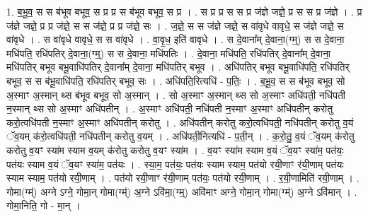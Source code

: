 \documentclass[17pt]{extarticle}
\begin{document}
1. ब॒भू॒व॒ स स ब॑भूव बभूव॒ स प्र प्र स ब॑भूव बभूव॒ स प्र । . स प्र प्र स स प्र ज॑ज्ञे जज्ञे॒ प्र स स प्र ज॑ज्ञे । . प्र ज॑ज्ञे जज्ञे॒ प्र प्र ज॑ज्ञे॒ स स ज॑ज्ञे॒ प्र प्र ज॑ज्ञे॒ सः । . ज॒ज्ञे॒ स स ज॑ज्ञे जज्ञे॒ स वा॑वृधे वावृधे॒ स ज॑ज्ञे जज्ञे॒ स वा॑वृधे । . स वा॑वृधे वावृधे॒ स स वा॑वृधे । . वा॒वृ॒ध॒ इति॑ वावृधे । . स दे॒वाना᳚म् दे॒वाना॒(ग्म्॒) स स दे॒वाना॒ मधि॑पति॒ रधि॑पतिर् दे॒वाना॒(ग्म्॒) स स दे॒वाना॒ मधि॑पतिः । . दे॒वाना॒ मधि॑पति॒ रधि॑पतिर् दे॒वाना᳚म् दे॒वाना॒ मधि॑पतिर् बभूव बभू॒वाधि॑पतिर् दे॒वाना᳚म् दे॒वाना॒ मधि॑पतिर् बभूव । . अधि॑पतिर् बभूव बभू॒वाधि॑पति॒ रधि॑पतिर् बभूव॒ स स ब॑भू॒वाधि॑पति॒ रधि॑पतिर् बभूव॒ सः । . अधि॑पति॒रित्यधि॑ - प॒तिः॒ । . ब॒भू॒व॒ स स ब॑भूव बभूव॒ सो अ॒स्माꣳ अ॒स्मान् थ्स ब॑भूव बभूव॒ सो अ॒स्मान् । . सो अ॒स्माꣳ अ॒स्मान् थ्स सो अ॒स्माꣳ अधि॑पती॒ नधि॑पती न॒स्मान् थ्स सो अ॒स्माꣳ अधि॑पतीन् । . अ॒स्माꣳ अधि॑पती॒ नधि॑पती न॒स्माꣳ अ॒स्माꣳ अधि॑पतीन् करोतु करो॒त्वधि॑पती न॒स्माꣳ अ॒स्माꣳ अधि॑पतीन् करोतु । . अधि॑पतीन् करोतु करो॒त्वधि॑पती॒ नधि॑पतीन् करोतु व॒यं ॅव॒यम् क॑रो॒त्वधि॑पती॒ नधि॑पतीन् करोतु व॒यम् । . अधि॑पती॒नित्यधि॑ - प॒ती॒न् । . क॒रो॒तु॒ व॒यं ॅव॒यम् क॑रोतु करोतु व॒यꣳ स्या॑म स्याम व॒यम् क॑रोतु करोतु व॒यꣳ स्या॑म । . व॒यꣳ स्या॑म स्याम व॒यं ॅव॒यꣳ स्या॑म॒ पत॑यः॒ पत॑यः स्याम व॒यं ॅव॒यꣳ स्या॑म॒ पत॑यः । . स्या॒म॒ पत॑यः॒ पत॑यः स्याम स्याम॒ पत॑यो रयी॒णाꣳ र॑यी॒णाम् पत॑यः स्याम स्याम॒ पत॑यो रयी॒णाम् । . पत॑यो रयी॒णाꣳ र॑यी॒णाम् पत॑यः॒ पत॑यो रयी॒णाम् । . र॒यी॒णामिति॑ रयी॒णाम् । . गोमा(ग्म्॑) अग्ने ऽग्ने॒ गोमा॒न् गोमा(ग्म्॑) अ॒ग्ने ऽवि॑मा॒(ग्म्॒) अवि॑माꣳ अग्ने॒ गोमा॒न् गोमा(ग्म्॑) अ॒ग्ने ऽवि॑मान् । . गोमा॒निति॒ गो - मा॒न् । \newline
\end{document}
